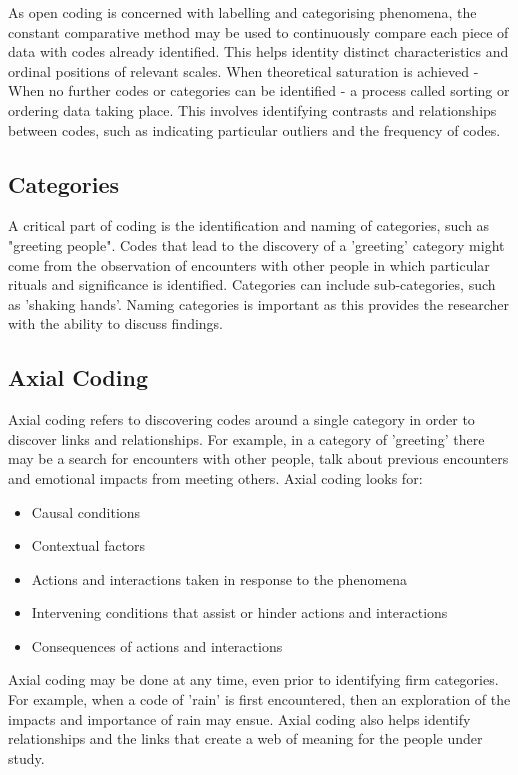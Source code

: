 \documentclass{article}
\begin{document}
As open coding is concerned with labelling and categorising phenomena, the constant comparative method may be used to continuously compare each piece of data with codes already identified. This helps identity distinct characteristics and ordinal positions of relevant scales. When theoretical saturation is achieved - When no further codes or categories can be identified - a process called sorting or ordering data taking place. This involves identifying contrasts and relationships between codes, such as indicating particular outliers and the frequency of codes. 


\subsection{Categories}
A critical part of coding is the identification and naming of categories, such as "greeting people". Codes that lead to the discovery of a 'greeting' category might come from the observation of encounters with other people in which particular rituals and significance is identified. Categories can include sub-categories, such as 'shaking hands'. Naming categories is important as this provides the researcher with the ability to discuss findings.

\subsection{Axial Coding}
Axial coding refers to discovering codes around a single category in order to discover links and relationships. For example, in a category of 'greeting' there may be a search for encounters with other people, talk about previous encounters and emotional impacts from meeting others. Axial coding looks for:
\begin{itemize}
    \item Causal conditions
    \item Contextual factors
    \item Actions and interactions taken in response to the phenomena
    \item Intervening conditions that assist or hinder actions and interactions
    \item Consequences of actions and interactions
\end{itemize}
Axial coding may be done at any time, even prior to identifying firm categories. For example, when a code of 'rain' is first encountered, then an exploration of the impacts and importance of rain may ensue. Axial coding also helps identify relationships and the links that create a web of meaning for the people under study.
\end{document}
